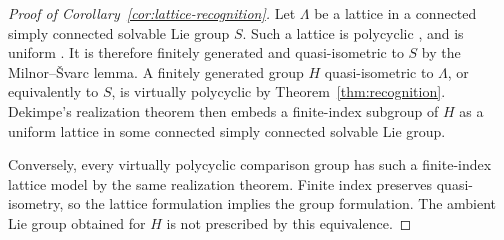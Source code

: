 \begin{proof}[Proof of Corollary~\ref{cor:lattice-recognition}]
Let $\Lambda$ be a lattice in a connected simply connected solvable Lie
group $S$.  Such a lattice is polycyclic
\cite[Proposition~3.4]{FarbWeinberger2008}, and is uniform
\cite[Theorem~2.9(i)]{Geng2015}.  It is therefore finitely generated and
quasi-isometric to $S$ by the Milnor--\v{S}varc lemma.  A finitely
generated group $H$ quasi-isometric to $\Lambda$, or equivalently to
$S$, is virtually polycyclic by Theorem~\ref{thm:recognition}.
Dekimpe's realization theorem \cite[Theorem~4.1]{Dekimpe2000} then
embeds a finite-index subgroup of $H$ as a uniform lattice in some
connected simply connected solvable Lie group.

Conversely, every virtually polycyclic comparison group has such a
finite-index lattice model by the same realization theorem.  Finite
index preserves quasi-isometry, so the lattice formulation implies the
group formulation.  The ambient Lie group obtained for $H$ is not
prescribed by this equivalence.
\end{proof}
